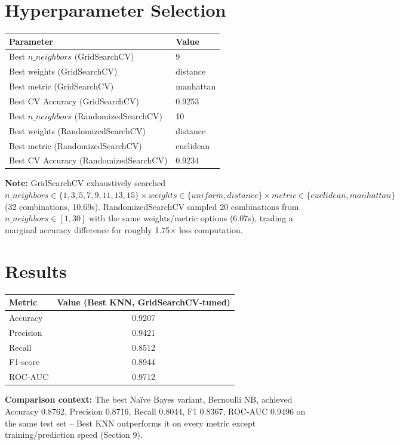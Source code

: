 \documentclass[12pt,a4paper]{article}
\begin{document}
\section{Hyperparameter Selection}

\begin{tabular}{ll}
\toprule
Parameter & Value\\
\midrule
Best $n\_neighbors$ (GridSearchCV) & 9 \\
Best weights (GridSearchCV) & distance \\
Best metric (GridSearchCV) & manhattan \\
Best CV Accuracy (GridSearchCV) & 0.9253 \\
Best $n\_neighbors$ (RandomizedSearchCV) & 10 \\
Best weights (RandomizedSearchCV) & distance \\
Best metric (RandomizedSearchCV) & euclidean \\
Best CV Accuracy (RandomizedSearchCV) & 0.9234 \\
\bottomrule
\end{tabular}

\textbf{Note:} GridSearchCV exhaustively searched
$n\_neighbors \in \{1,3,5,7,9,11,13,15\} \times weights \in \{uniform, distance\} \times
metric \in \{euclidean, manhattan\}$ (32 combinations, 10.69s). RandomizedSearchCV sampled 20
combinations from $n\_neighbors \in [1,30]$ with the same weights/metric options (6.07s),
trading a marginal accuracy difference for roughly 1.75$\times$ less computation.

\section{Results}

\begin{tabular}{lc}
\toprule
Metric & Value (Best KNN, GridSearchCV-tuned)\\
\midrule
Accuracy & 0.9207 \\
Precision & 0.9421 \\
Recall & 0.8512 \\
F1-score & 0.8944 \\
ROC-AUC & 0.9712 \\
\bottomrule
\end{tabular}

\textbf{Comparison context:} The best Na\"ive Bayes variant, Bernoulli NB, achieved Accuracy
0.8762, Precision 0.8716, Recall 0.8044, F1 0.8367, ROC-AUC 0.9496 on the same test set --
Best KNN outperforms it on every metric except training/prediction speed (Section 9).
\end{document}
